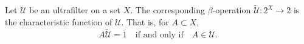 Let $\mathcal{U}$ be an ultrafilter on a set $X$. The corresponding $\beta$-operation $\tilde{\mathcal{U}}: 2^X \to 2$ is the characteristic function of $\mathcal{U}$. That is, for $A \subset X$,
$$
A\tilde{\mathcal{U}} = 1 \quad \text{if and only if} \quad A \in \mathcal{U}.
$$
